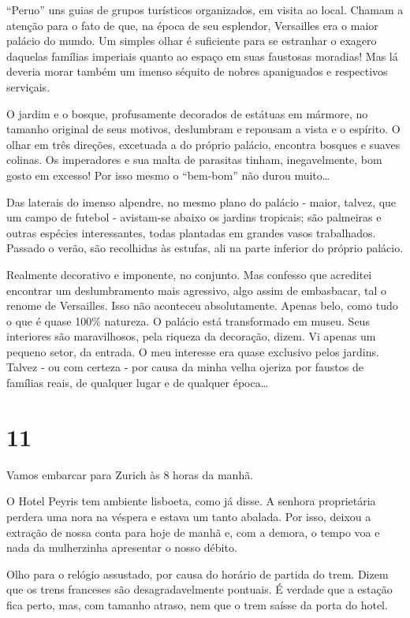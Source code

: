 “Peruo” uns guias de grupos turísticos organizados, em visita ao local. Chamam a atenção para o fato de que, na época de seu esplendor, Versailles era o maior palácio do mundo. Um simples olhar é suficiente para se estranhar o exagero daquelas famílias imperiais quanto ao espaço em suas faustosas moradias! Mas lá deveria morar também um imenso séquito de nobres apaniguados e respectivos serviçais.

O jardim e o bosque, profusamente decorados de estátuas em mármore, no tamanho original de seus motivos, deslumbram e repousam a vista e o espírito. O olhar em três direções, excetuada a do próprio palácio, encontra bosques e suaves colinas. Os imperadores e sua malta de parasitas tinham, inegavelmente, bom gosto em excesso! Por isso mesmo o “bem-bom” não durou muito\ldots

Das laterais do imenso alpendre, no mesmo plano do palácio - maior, talvez, que um campo de futebol - avistam-se abaixo os jardins tropicais; são palmeiras e outras espécies interessantes, todas plantadas em grandes vasos trabalhados. Passado o verão, são recolhidas às estufas, ali na parte inferior do próprio palácio.

Realmente decorativo e imponente, no conjunto. Mas confesso que acreditei encontrar um deslumbramento mais agressivo, algo assim de embasbacar, tal o renome de Versailles. Isso não aconteceu absolutamente. Apenas belo, como tudo o que é quase 100\% natureza. O palácio está transformado em museu. Seus interiores são maravilhosos, pela riqueza da decoração, dizem. Vi apenas um pequeno setor, da entrada. O meu interesse era quase exclusivo pelos jardins. Talvez - ou com certeza - por causa da minha velha ojeriza por faustos de famílias reais, de qualquer lugar e de qualquer época\ldots

\section*{11 \adfflatleafright {}}
Vamos embarcar para Zurich às 8 horas da manhã.

O Hotel Peyris tem ambiente lisboeta, como já disse. A senhora proprietária perdera uma nora na véspera e estava um tanto abalada. Por isso, deixou a extração de nossa conta para hoje de manhã e, com a demora, o tempo voa e nada da mulherzinha apresentar o nosso débito.

Olho para o relógio assustado, por causa do horário de partida do trem. Dizem que os trens franceses são desagradavelmente pontuais. É verdade que a estação fica perto, mas, com tamanho atraso, nem que o trem saísse da porta do hotel.

